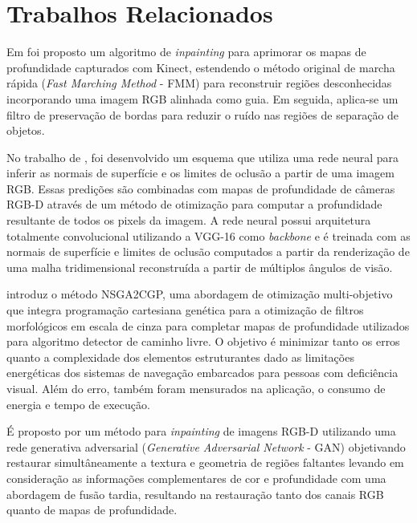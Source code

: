 \chapter{Trabalhos Relacionados}


Em  foi proposto um algoritmo de \textit{inpainting} para aprimorar os mapas de profundidade capturados com Kinect, estendendo o método original de marcha rápida (\textit{Fast Marching Method} - FMM) para reconstruir regiões desconhecidas incorporando uma imagem RGB alinhada como guia. Em seguida, aplica-se um filtro de preservação de bordas para reduzir o ruído nas regiões de separação de objetos. 

No trabalho de , foi desenvolvido um esquema que utiliza uma rede neural para inferir as normais de superfície e os limites de oclusão a partir de uma imagem RGB. Essas predições são combinadas com mapas de profundidade de câmeras RGB-D através de um método de otimização para computar a profundidade resultante de todos os pixels da imagem. A rede neural possui arquitetura totalmente convolucional utilizando a VGG-16 como \textit{backbone} e é treinada com as normais de superfície e limites de oclusão computados a partir da renderização de uma malha tridimensional reconstruída a partir de múltiplos ângulos de visão. 
 

 introduz o método NSGA2CGP, uma abordagem de otimização multi-objetivo que integra programação cartesiana genética para a otimização de filtros morfológicos em escala de cinza para completar mapas de profundidade utilizados para algoritmo detector de caminho livre. O objetivo é minimizar tanto os erros quanto a complexidade dos elementos estruturantes dado as limitações energéticas dos sistemas de navegação embarcados para pessoas com deficiência visual. Além do erro, também foram mensurados na aplicação, o consumo de energia e tempo de execução. 


É proposto por  um método para \textit{inpainting} de imagens RGB-D utilizando uma rede generativa adversarial (\textit{Generative Adversarial Network} - GAN) objetivando restaurar simultâneamente a textura e geometria de regiões faltantes levando em consideração as informações complementares de cor e profundidade com uma abordagem de fusão tardia, resultando na restauração tanto dos canais RGB quanto de mapas de profundidade.

